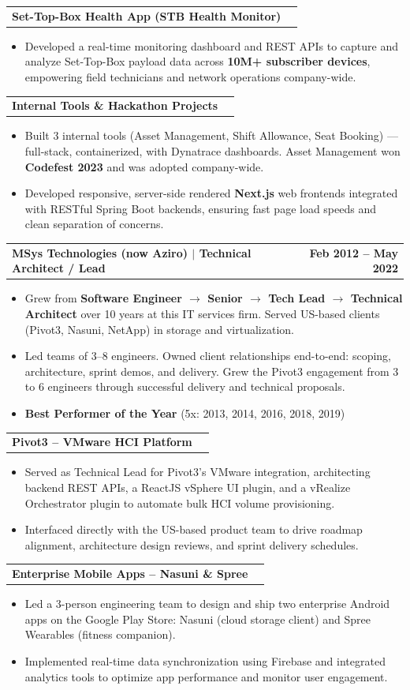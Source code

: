 \documentclass[letterpaper,11pt]{article}
\makeatletter
\newcommand{\resumeItem}[1]{
  \item\small{
    {#1 \vspace{-2pt}}
  }
}
\newcommand{\resumeProjectHeading}[2]{
    \item
    \begin{tabular*}{1.001\textwidth}{l@{\extracolsep{\fill}}r}
      \small#1 & \textbf{\small #2}\\
    \end{tabular*}\vspace{-7pt}
}
\newcommand{\resumeItemListStart}{\begin{itemize}}
\newcommand{\resumeItemListEnd}{\end{itemize}\vspace{-5pt}}
\makeatother
\begin{document}
\vspace{-13pt}
\resumeProjectHeading
  {\textbf{Set-Top-Box Health App (STB Health Monitor)}}{}
\resumeItemListStart
\resumeItem{Developed a real-time monitoring dashboard and REST APIs to capture and analyze Set-Top-Box payload data across \textbf{10M+ subscriber devices}, empowering field technicians and network operations company-wide.}
\resumeItemListEnd

\vspace{-13pt}
\resumeProjectHeading
  {\textbf{Internal Tools \& Hackathon Projects}}{}
\resumeItemListStart
\resumeItem{Built 3 internal tools (Asset Management, Shift Allowance, Seat Booking) --- full-stack, containerized, with Dynatrace dashboards. Asset Management won \textbf{Codefest 2023} and was adopted company-wide.}
\resumeItem{Developed responsive, server-side rendered \textbf{Next.js} web frontends integrated with RESTful Spring Boot backends, ensuring fast page load speeds and clean separation of concerns.}
\resumeItemListEnd

\vspace{-13pt}

  \resumeProjectHeading{\textbf{MSys Technologies (now Aziro) $\vert$ Technical Architect / Lead}}{Feb 2012 -- May 2022}
      \resumeItemListStart
          \resumeItem{Grew from \textbf{Software Engineer $\rightarrow$ Senior $\rightarrow$ Tech Lead $\rightarrow$ Technical Architect} over 10 years at this IT services firm. Served US-based clients (Pivot3, Nasuni, NetApp) in storage and virtualization.}
          \resumeItem{Led teams of 3--8 engineers. Owned client relationships end-to-end: scoping, architecture, sprint demos, and delivery. Grew the Pivot3 engagement from 3 to 6 engineers through successful delivery and technical proposals.}
          \resumeItem{\textbf{Best Performer of the Year} (5x: 2013, 2014, 2016, 2018, 2019)}
      \resumeItemListEnd

\vspace{-13pt}
\resumeProjectHeading
{\textbf{Pivot3 -- VMware HCI Platform}}{}
\resumeItemListStart
\resumeItem{Served as Technical Lead for Pivot3's VMware integration, architecting backend REST APIs, a ReactJS vSphere UI plugin, and a vRealize Orchestrator plugin to automate bulk HCI volume provisioning.}
\resumeItem{Interfaced directly with the US-based product team to drive roadmap alignment, architecture design reviews, and sprint delivery schedules.}
\resumeItemListEnd

\vspace{-13pt}
\resumeProjectHeading
{\textbf{Enterprise Mobile Apps -- Nasuni \& Spree}}{}
\resumeItemListStart
\resumeItem{Led a 3-person engineering team to design and ship two enterprise Android apps on the Google Play Store: Nasuni (cloud storage client) and Spree Wearables (fitness companion).}
\resumeItem{Implemented real-time data synchronization using Firebase and integrated analytics tools to optimize app performance and monitor user engagement.}
\resumeItemListEnd
\end{document}

